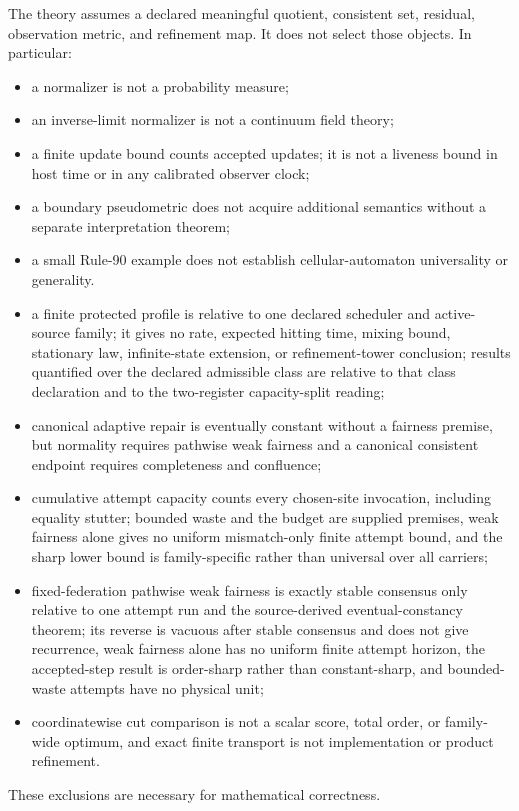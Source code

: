\documentclass[11pt]{article}
\theoremstyle{definition}
\theoremstyle{remark}
\numberwithin{equation}{section}
\begin{document}
The theory assumes a declared meaningful quotient, consistent set, residual, observation metric, and refinement map.  It does not select those objects.  In particular:
\begin{itemize}
\item a normalizer is not a probability measure;
\item an inverse-limit normalizer is not a continuum field theory;
\item a finite update bound counts accepted updates; it is not a liveness
      bound in host time or in any calibrated observer clock;
\item a boundary pseudometric does not acquire additional semantics without a separate interpretation theorem;
\item a small Rule-90 example does not establish cellular-automaton universality or generality.
\item a finite protected profile is relative to one declared scheduler and
      active-source family; it gives no rate, expected hitting time, mixing
      bound, stationary law, infinite-state extension, or refinement-tower
      conclusion; results quantified over the declared admissible class are
      relative to that class declaration and to the two-register
      capacity-split reading;
\item canonical adaptive repair is eventually constant without a fairness
      premise, but normality requires pathwise weak fairness and a
      canonical consistent endpoint requires completeness and
      confluence;
\item cumulative attempt capacity counts every chosen-site invocation,
      including equality stutter; bounded waste and the budget are supplied
      premises, weak fairness alone gives no uniform mismatch-only finite attempt bound, and the
      sharp lower bound is family-specific rather than universal over all
      carriers;
\item fixed-federation pathwise weak fairness is exactly stable consensus only
      relative to one attempt run and the source-derived eventual-constancy
      theorem; its reverse is vacuous after stable consensus and does not give
      recurrence, weak fairness alone has no uniform finite attempt horizon,
      the accepted-step result is order-sharp rather than constant-sharp, and
      bounded-waste attempts have no physical unit;
\item coordinatewise cut comparison is not a scalar score, total order, or
      family-wide optimum, and exact finite transport is not implementation or
      product refinement.
\end{itemize}
These exclusions are necessary for mathematical correctness.
\end{document}
